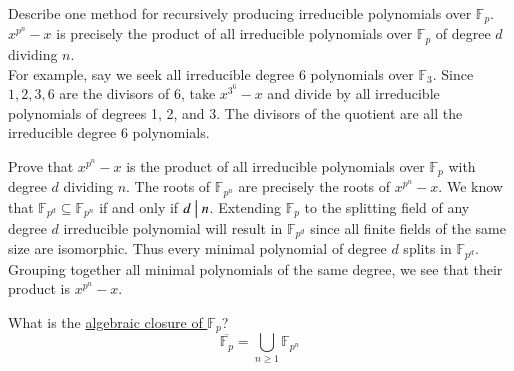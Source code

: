\documentclass[avery5371,grid]{flashcards}
\newcommand{\F}{\mathbb{F}}
\newcommand{\divides}{\bigm|}
\begin{document}
\begin{flashcard}[Fields]{Describe one method for recursively producing irreducible polynomials over $\F_p$.}
 $x^{p^n} - x$ is precisely the product of all irreducible polynomials over $\F_p$ of degree $d$ dividing $n$. \\
 
 For example, say we seek all irreducible degree 6 polynomials over $\F_3$. Since $1,2,3,6$ are the divisors of 6, take $x^{3^6} - x$ and divide by all irreducible polynomials of degrees 1, 2, and 3. The divisors of the quotient are all the irreducible degree 6 polynomials.
\end{flashcard}

\begin{flashcard}[Fields]{Prove that $x^{p^n} - x$ is the product of all irreducible polynomials over $\F_p$ with degree $d$ dividing $n$.}
 The roots of $\F_{p^n}$ are precisely the roots of $x^{p^n} - x$. We know that $\F_{p^d} \subseteq \F_{p^n}$ if and only if $d \divides n$. Extending $\F_p$ to the splitting field of any degree $d$ irreducible polynomial will result in $\F_{p^d}$ since all finite fields of the same size are isomorphic. Thus every minimal polynomial of degree $d$ splits in $\F_{p^d}$. Grouping together all minimal polynomials of the same degree, we see that their product is $x^{p^n} - x$.
\end{flashcard}

\begin{flashcard}[Fields]{What is the \underline{algebraic closure of $\F_p$}?}
 $$
 \overline{\F_p} = \bigcup_{n \geq 1} \F_{p^n}
 $$
\end{flashcard}
\end{document}
